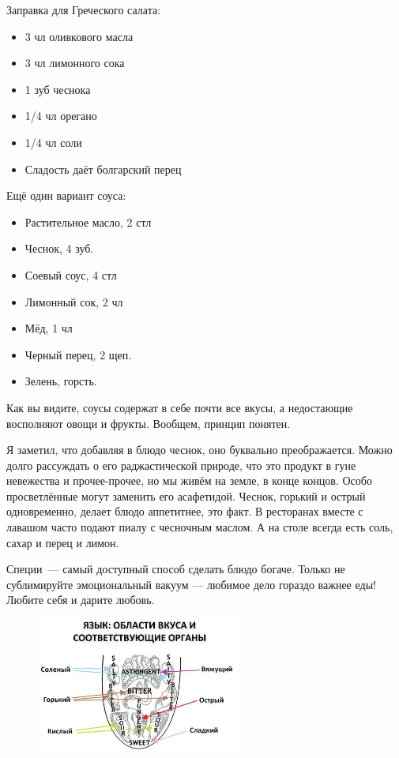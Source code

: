 Заправка для Греческого салата:
\begin{itemize}
\item 3 чл оливкового масла
\item 3 чл лимонного сока
\item 1 зуб чеснока
\item 1/4 чл орегано
\item 1/4 чл соли
\item Сладость даёт болгарский перец
\end{itemize}

Ещё один вариант соуса:
\begin{itemize}
\item Растительное масло, 2 стл
\item Чеснок, 4 зуб.
\item Соевый соус, 4 стл
\item Лимонный сок, 2 чл
\item Мёд, 1 чл
\item Черный перец, 2 щеп.
\item Зелень, горсть.
\end{itemize}

Как вы видите, соусы содержат в себе почти все вкусы, а недостающие восполняют овощи и фрукты. Вообщем, принцип понятен.

Я заметил, что добавляя в блюдо чеснок, оно буквально преображается. Можно долго рассуждать о его раджастической природе, что это продукт в гуне невежества и прочее-прочее, но мы живём на земле, в конце концов. Особо просветлённые могут заменить его асафетидой. Чеснок, горький и острый одновременно, делает блюдо аппетитнее, это факт. В ресторанах вместе с лавашом часто подают пиалу с чесночным маслом. А на столе всегда есть соль, сахар и перец и лимон.

Специи~--- самый доступный способ сделать блюдо богаче. Только не сублимируйте эмоциональный вакуум — любимое дело гораздо важнее еды! Любите себя и дарите любовь.


\begin{figure}[ht]
    \centering
    \includegraphics[width=0.6\textwidth]{img/SixTastes}
    \label{fig:1}
\end{figure} 

